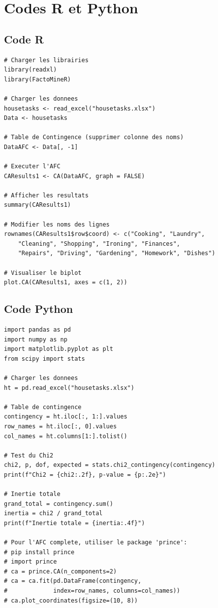 \documentclass[12pt,a4paper]{article}
\begin{document}
\section{Codes R et Python}

\subsection{Code R}

\begin{lstlisting}[style=Rstyle, caption={Code R pour l'AFC avec FactoMineR}]
# Charger les librairies
library(readxl)
library(FactoMineR)

# Charger les donnees
housetasks <- read_excel("housetasks.xlsx")
Data <- housetasks

# Table de Contingence (supprimer colonne des noms)
DataAFC <- Data[, -1]

# Executer l'AFC
CAResults1 <- CA(DataAFC, graph = FALSE)

# Afficher les resultats
summary(CAResults1)

# Modifier les noms des lignes
rownames(CAResults1$row$coord) <- c("Cooking", "Laundry", 
    "Cleaning", "Shopping", "Ironing", "Finances", 
    "Repairs", "Driving", "Gardening", "Homework", "Dishes")

# Visualiser le biplot
plot.CA(CAResults1, axes = c(1, 2))
\end{lstlisting}

\subsection{Code Python}

\begin{lstlisting}[style=Pythonstyle, caption={Code Python pour l'AFC}]
import pandas as pd
import numpy as np
import matplotlib.pyplot as plt
from scipy import stats

# Charger les donnees
ht = pd.read_excel("housetasks.xlsx")

# Table de contingence
contingency = ht.iloc[:, 1:].values
row_names = ht.iloc[:, 0].values
col_names = ht.columns[1:].tolist()

# Test du Chi2
chi2, p, dof, expected = stats.chi2_contingency(contingency)
print(f"Chi2 = {chi2:.2f}, p-value = {p:.2e}")

# Inertie totale
grand_total = contingency.sum()
inertia = chi2 / grand_total
print(f"Inertie totale = {inertia:.4f}")

# Pour l'AFC complete, utiliser le package 'prince':
# pip install prince
# import prince
# ca = prince.CA(n_components=2)
# ca = ca.fit(pd.DataFrame(contingency, 
#             index=row_names, columns=col_names))
# ca.plot_coordinates(figsize=(10, 8))
\end{lstlisting}
\end{document}

